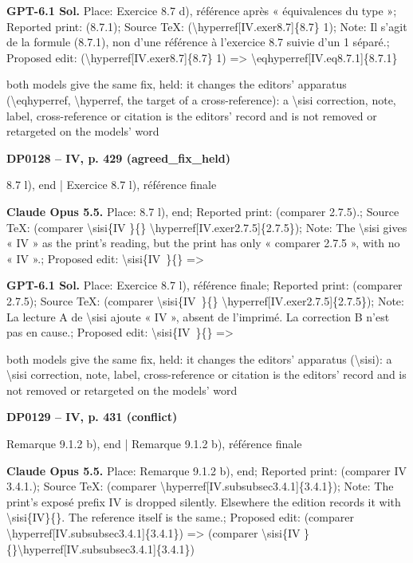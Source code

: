 \textbf{GPT-6.1 Sol.} Place: Exercice 8.7 d), référence après « équivalences du type »; Reported print: (8.7.1); Source TeX: (\textbackslash{}hyperref[IV.exer8.7]\{8.7\} 1); Note: Il s'agit de la formule (8.7.1), non d'une référence à l'exercice 8.7 suivie d'un 1 séparé.; Proposed edit: (\textbackslash{}hyperref[IV.exer8.7]\{8.7\} 1) =\allowbreak > \textbackslash{}eqhyperref[IV.eq8.7.1]\{8.7.1\}\par
both models give the same fix, held: it changes the editors' apparatus (\textbackslash{}eqhyperref, \textbackslash{}hyperref, the target of a cross-reference): a \textbackslash{}sisi correction, note, label, cross-reference or citation is the editors' record and is not removed or retargeted on the models' word\par
\par\noindent\hypertarget{DP0128}{}\textbf{DP0128 -- IV, p. 429 (agreed\_fix\_held)}\par
8.7 l), end | Exercice 8.7 l), référence finale\par
\textbf{Claude Opus 5.5.} Place: 8.7 l), end; Reported print: (comparer 2.7.5).; Source TeX: (comparer \textbackslash{}sisi\{IV \}\{\} \textbackslash{}hyperref[IV.exer2.7.5]\{2.7.5\}); Note: The \textbackslash{}sisi gives « IV » as the print's reading, but the print has only « comparer 2.7.5 », with no « IV ».; Proposed edit: \textbackslash{}sisi\{IV~\}\{\} =\allowbreak > \par
\textbf{GPT-6.1 Sol.} Place: Exercice 8.7 l), référence finale; Reported print: (comparer 2.7.5); Source TeX: (comparer \textbackslash{}sisi\{IV~\}\{\} \textbackslash{}hyperref[IV.exer2.7.5]\{2.7.5\}); Note: La lecture A de \textbackslash{}sisi ajoute « IV », absent de l'imprimé. La correction B n'est pas en cause.; Proposed edit: \textbackslash{}sisi\{IV~\}\{\} =\allowbreak > \par
both models give the same fix, held: it changes the editors' apparatus (\textbackslash{}sisi): a \textbackslash{}sisi correction, note, label, cross-reference or citation is the editors' record and is not removed or retargeted on the models' word\par
\par\noindent\hypertarget{DP0129}{}\textbf{DP0129 -- IV, p. 431 (conflict)}\par
Remarque 9.1.2 b), end | Remarque 9.1.2 b), référence finale\par
\textbf{Claude Opus 5.5.} Place: Remarque 9.1.2 b), end; Reported print: (comparer IV 3.4.1.); Source TeX: (comparer \textbackslash{}hyperref[IV.subsubsec3.4.1]\{3.4.1\}); Note: The print's exposé prefix IV is dropped silently. Elsewhere the edition records it with \textbackslash{}sisi\{IV\}\{\}. The reference itself is the same.; Proposed edit: (comparer \textbackslash{}hyperref[IV.subsubsec3.4.1]\{3.4.1\}) =\allowbreak > (comparer \textbackslash{}sisi\{IV \}\{\}\textbackslash{}hyperref[IV.subsubsec3.4.1]\{3.4.1\})\par
